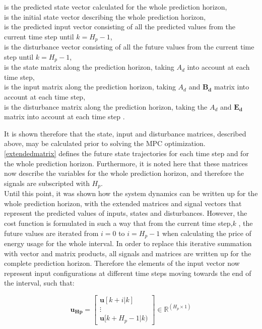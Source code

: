  \begin{minipage}[t]{0.70\textwidth}
 \vspace*{2mm}
 is the predicted state vector calculated for the whole prediction horizon, \\
 is the initial state vector describing the whole prediction horizon, \\
 is the predicted input vector consisting of all the predicted values from the current time step until $k = H_p-1$, \\
 is the disturbance vector consisting of all the future values from the current time step until $k = H_p-1$, \\
 is the state matrix along the prediction horizon, taking $A_d$ into account at each time step, \\
 is the input matrix along the prediction horizon, taking $A_d$ and $\bm{B_d}$ matrix into account at each time step, \\
 is the disturbance matrix along the prediction horizon, taking the $A_d$ and $\bm{E_d}$ matrix into account at each time step . \\ 
 \end{minipage}

It is shown therefore that the state, input and disturbance matrices, described above, may be calculated prior to solving the MPC optimization. \eqref{extendedmatrix} defines the future state trajectories for each time step and for the whole prediction horizon. Furthermore, it is noted here that these matrices now describe the variables for the whole prediction horizon, and therefore the signals are subscripted with $H_p$. 
\\
\newline
Until this point, it was shown how the system dynamics can be written up for the whole prediction horizon, with the extended matrices and signal vectors that represent the predicted values of inputs, states and disturbances. However, the cost function is formulated in such a way that from the current time step,$k$ , the future values are iterated from $i = 0$ to $i = H_p - 1$ when calculating the price of energy usage for the whole interval. In order to replace this iterative summation with vector and matrix products, all signals and matrices are written up for the complete prediction horizon. Therefore the elements of the input vector now represent input configurations at different time steps moving towards the end of the interval, such that:

\begin{equation}
\bm{u_{Hp}} =  
 \begin{bmatrix}
  \bm{u}[k+i|k]\\
  \vdots  \\
  \bm{u}[k+H_p-1|k)   
 \end{bmatrix}
 \in \pmb{\mathbb{R}}^{(H_p \times 1)}
\end{equation}

